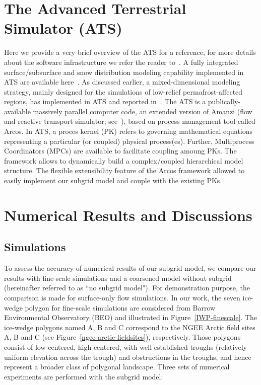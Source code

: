 \documentclass[review,11pt]{elsarticle}
\begin{document}
\section{The Advanced Terrestrial Simulator (ATS)}\label{ATS}
Here we provide a very brief overview of the ATS for a reference, for more details about the software infrastructure we refer the reader to~\cite{ecoon2016managing, ats-website}. A fully integrated surface/subsurface and snow distribution modeling capability implemented in ATS are available here~\cite{spainter2016integrated, atchley2015}. As discussed earlier, a mixed-dimensional modeling strategy, mainly designed for the simulations of low-relief permafrost-affected regions, has implemented in ATS and reported in~\cite{jan2017}. The ATS is a publically-available massively parallel computer code, an extended version of Amanzi (flow and reactive transport simulator; see~\cite{moulton2012high}), based on process management tool called Arcos. In ATS, a proces kernel (PK) refers to governing mathematical equations representing a particular (or coupled) physical process(es). Further, Multiprocess Coordinators (MPCs) are available to facilitate coupling amoung PKs. The framework allows to dynamically build a complex/coupled hierarchical model structure. The flexible extensibility feature of the Arcos framework allowed to easily implement our subgrid model and couple with the existing PKs.

\section{Numerical Results and Discussions}\label{numerical-tests}
\FloatBarrier
\subsection{Simulations}
To assess the accuracy of numerical results of our subgrid model, we compare our results with fine-scale simulations and a coarsened model without subgrid (hereinafter referred to as ``no subgrid model"). For demonstration purpose, the comparison is made for surface-only flow simulations. In our work, the seven ice-wedge polygon for fine-scale simulations are considered from Barrow Environmental Observatory (BEO) and illustrated in Figure~\ref{IWP-finescale}. The ice-wedge polygons named A, B and C correspond to the NGEE Arctic field sites A, B and C (see Figure~\ref{ngee-arctic-fieldsites}), respectively. Those polygons consist of low-centered, high-centered, with well established troughs (relatively uniform elevation across the trough) and obstructions in the troughs, and hence represent a broader class of polygonal landscape. Three sets of numerical experiments are performed with the subgrid model:
\end{document}
